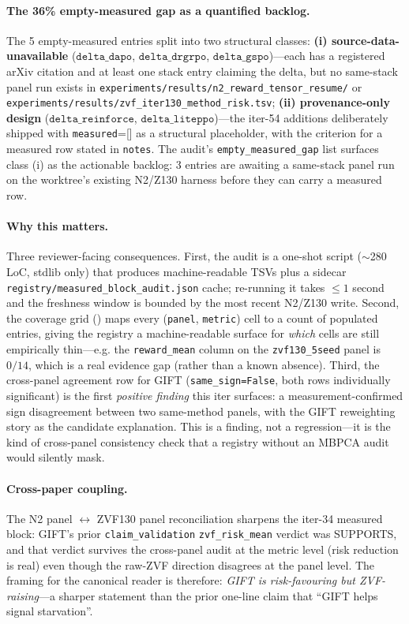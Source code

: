 \paragraph{The 36\% empty-measured gap as a quantified backlog.}
The 5 empty-measured entries split into two structural classes:
\textbf{(i) source-data-unavailable} ($\texttt{delta\_dapo}$,
$\texttt{delta\_drgrpo}$, $\texttt{delta\_gspo}$)---each has a
registered arXiv citation and at least one stack entry claiming the
delta, but no same-stack panel run exists in
\texttt{experiments/results/n2\_reward\_tensor\_resume/} or
\texttt{experiments/results/zvf\_iter130\_method\_risk.tsv};
\textbf{(ii) provenance-only design} ($\texttt{delta\_reinforce}$,
$\texttt{delta\_liteppo}$)---the iter-54 additions deliberately
shipped with \texttt{measured}=[] as a structural placeholder, with
the criterion for a measured row stated in \texttt{notes}. The
audit's \texttt{empty\_measured\_gap} list surfaces class (i) as
the actionable backlog: 3 entries are awaiting a same-stack panel run
on the worktree's existing N2/Z130 harness before they can carry a
measured row.

\paragraph{Why this matters.} Three reviewer-facing consequences.
First, the audit is a one-shot script ($\sim$280\,LoC, stdlib only)
that produces machine-readable TSVs plus a sidecar
\texttt{registry/measured\_block\_audit.json} cache; re-running it
takes $\leq 1$ second and the freshness window is bounded by the most
recent N2/Z130 write. Second, the coverage grid
() maps every (\texttt{panel},
\texttt{metric}) cell to a count of populated entries, giving the
registry a machine-readable surface for \emph{which} cells are still
empirically thin---e.g. the \texttt{reward\_mean} column on the
\texttt{zvf130\_5seed} panel is $0/14$, which is a real evidence gap
(rather than a known absence). Third, the cross-panel agreement row
for GIFT (\texttt{same\_sign=False}, both rows individually significant)
is the first \emph{positive finding} this iter surfaces: a
measurement-confirmed sign disagreement between two same-method
panels, with the GIFT reweighting story as the candidate
explanation. This is a finding, not a regression---it is the kind
of cross-panel consistency check that a registry without an MBPCA
audit would silently mask.

\paragraph{Cross-paper coupling.}
The N2 panel ${}\leftrightarrow{}$ ZVF130 panel reconciliation
sharpens the iter-34 measured block: GIFT's prior
\texttt{claim\_validation} \texttt{zvf\_risk\_mean} verdict was
SUPPORTS, and that verdict survives the cross-panel audit at the
metric level (risk reduction is real) even though the raw-ZVF
direction disagrees at the panel level. The framing for the
canonical reader is therefore: \emph{GIFT is risk-favouring but
ZVF-raising}---a sharper statement than the prior one-line claim
that ``GIFT helps signal starvation''.

